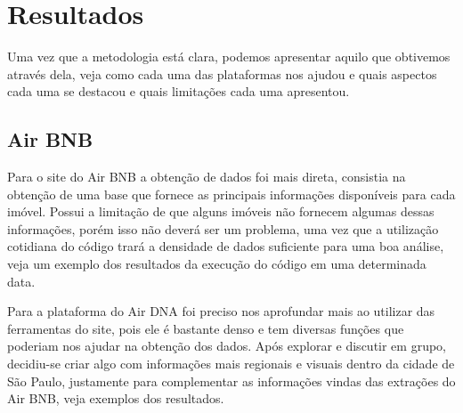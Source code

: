 \section*{Resultados}

Uma vez que a metodologia está clara, podemos apresentar aquilo que 
obtivemos através dela, veja como cada uma das plataformas nos ajudou e quais 
aspectos cada uma se destacou e quais limitações cada uma apresentou.

\subsection*{Air BNB}

Para o site do Air BNB a obtenção de dados foi mais direta, consistia 
na obtenção de uma base que fornece as principais informações disponíveis 
para cada imóvel. Possui a limitação de que alguns imóveis não fornecem
algumas dessas informações, porém isso não deverá ser um problema, uma 
vez que a utilização cotidiana do código trará a densidade de dados suficiente 
para uma boa análise, veja um exemplo dos resultados da execução do código 
em uma determinada data.

Para a plataforma do Air DNA foi preciso nos aprofundar mais ao 
utilizar das ferramentas do site, pois ele é bastante denso e tem diversas 
funções que poderiam nos ajudar na obtenção dos dados. Após explorar e 
discutir em grupo, decidiu-se criar algo com informações mais regionais e 
visuais dentro da cidade de São Paulo, justamente para complementar as 
informações vindas das extrações do Air BNB, veja exemplos dos resultados.

